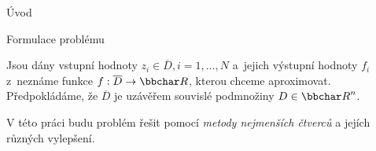 \chap Úvod


\sec Formulace problému

Jsou dány vstupní hodnoty $z_i \in \overline{D}, i = 1, \ldots, N$ a~jejich výstupní hodnoty $f_i$ z~neznáme funkce $f: \overline{D} \rightarrow \bbchar R$, kterou chceme aproximovat. Předpokládáme, že $\overline{D}$ je uzávěřem souvislé podmnožiny $D \in {\bbchar R}^n$.

V této práci budu problém řešit pomocí {\it metody nejmenších čtverců} a jejích různých vylepšení.
